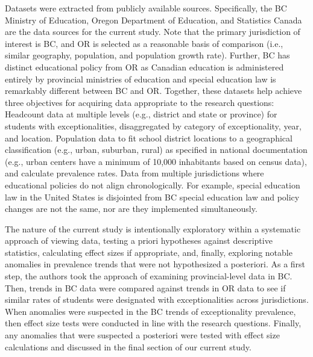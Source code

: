 \documentclass[
  english,
  man]{apa6}
\begin{document}
Datasets were extracted from publicly available sources. Specifically, the BC Ministry of Education, Oregon Department of Education, and Statistics Canada are the data sources for the current study. Note that the primary jurisdiction of interest is BC, and OR is selected as a reasonable basis of comparison (i.e., similar geography, population, and population growth rate). Further, BC has distinct educational policy from OR as Canadian education is administered entirely by provincial ministries of education and special education law is remarkably different between BC and OR. Together, these datasets help achieve three objectives for acquiring data appropriate to the research questions:
Headcount data at multiple levels (e.g., district and state or province) for students with exceptionalities, disaggregated by category of exceptionality, year, and location.
Population data to fit school district locations to a geographical classification (e.g., urban, suburban, rural) as specified in national documentation (e.g., urban centers have a minimum of 10,000 inhabitants based on census data), and calculate prevalence rates.
Data from multiple jurisdictions where educational policies do not align chronologically. For example, special education law in the United States is disjointed from BC special education law and policy changes are not the same, nor are they implemented simultaneously.

The nature of the current study is intentionally exploratory within a systematic approach of viewing data, testing a priori hypotheses against descriptive statistics, calculating effect sizes if appropriate, and, finally, exploring notable anomalies in prevalence trends that were not hypothesized a posteriori. As a first step, the authors took the approach of examining provincial-level data in BC. Then, trends in BC data were compared against trends in OR data to see if similar rates of students were designated with exceptionalities across jurisdictions. When anomalies were suspected in the BC trends of exceptionality prevalence, then effect size tests were conducted in line with the research questions. Finally, any anomalies that were suspected a posteriori were tested with effect size calculations and discussed in the final section of our current study.
\end{document}
